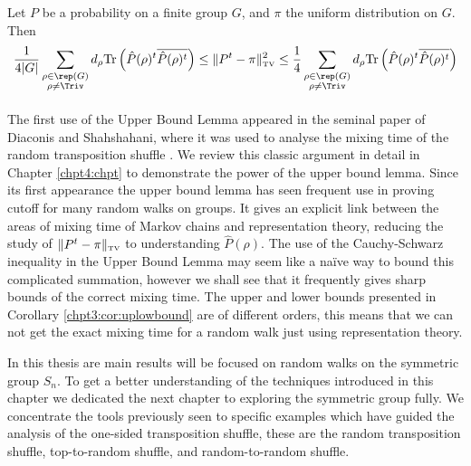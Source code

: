 \documentclass[11pt]{report}
\begin{document}
\begin{corollary}
	\label{chpt3:cor:uplowbound}
	Let $P$ be a probability on a finite group $G$, and $\pi$ the uniform 
	distribution on $G$. Then
	\begin{eqnarray}
	\label{chpt3:eqn:lowerbound}
	\frac{1}{4|G|}\sum_{\substack{\rho \in \rep(G) \\ \rho \neq \Triv}} 
	d_{\rho} \textnormal{Tr}\left( 
	\hat{P}(\rho)^{t}\overline{\hat{P}(\rho)^{t}}\right) \leq \lVert 
	P^{t} - \pi \rVert_{\textnormal{\tiny TV}}^{2} \leq 
	\frac{1}{4}\sum_{\substack{\rho \in \rep(G) \\ \rho \neq \Triv}} 
	d_{\rho} \textnormal{Tr}\left( 
	\hat{P}(\rho)^{t}\overline{\hat{P}(\rho)^{t}}\right)
	\end{eqnarray}
\end{corollary}

\paragraph{}
The first use of the Upper Bound Lemma appeared in the seminal paper of 
Diaconis and Shahshahani, where it was used to analyse the mixing time of the 
random transposition shuffle \cite[Lemma 14]{diaconis1981generating}. We review this 
classic argument in detail in Chapter \ref{chpt4:chpt} to demonstrate the power of the upper 
bound lemma. 
Since its first appearance the 
upper bound 
lemma has seen frequent use in proving cutoff for many random walks on groups. 
It 
gives an explicit link between the areas of mixing time 
of Markov chains and representation theory, reducing the study of $\lVert 
P^{t} - \pi \rVert_{\textnormal{\tiny TV}}$ to understanding  
$\hat{P}(\rho)$. The use of the Cauchy-Schwarz inequality in the Upper Bound Lemma 
may seem like a na\"{i}ve way to bound this complicated summation, however we shall see that it frequently gives sharp bounds of the correct mixing time. The upper and lower bounds presented  in Corollary 
\ref{chpt3:cor:uplowbound} are of different orders, this means that we can not get the exact mixing time for a random walk just using representation theory.



In this thesis are main results will be focused on random walks on the 
symmetric group $S_{n}$. To get a better understanding of the techniques 
introduced in this chapter we dedicated the next chapter to exploring the symmetric group fully.  We concentrate the tools previously seen to specific examples which have guided the analysis of the one-sided transposition shuffle, these are the random transposition shuffle, top-to-random shuffle, 
and random-to-random shuffle.
\end{document}
